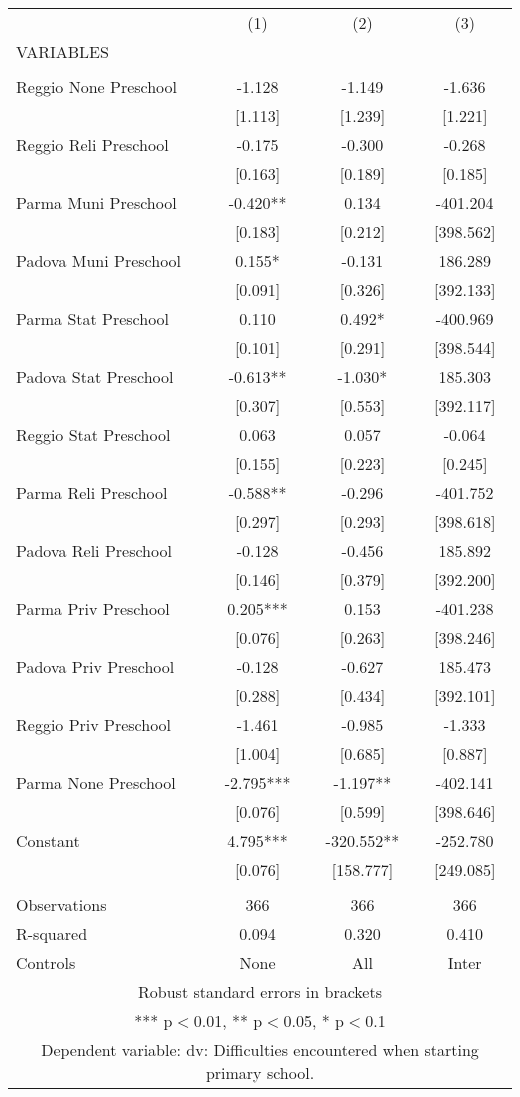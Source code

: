 \begin{tabular}{lccc} \hline
 & (1) & (2) & (3) \\
VARIABLES &  &  &  \\ \hline
 &  &  &  \\
Reggio None Preschool & -1.128 & -1.149 & -1.636 \\
 & [1.113] & [1.239] & [1.221] \\
Reggio Reli Preschool & -0.175 & -0.300 & -0.268 \\
 & [0.163] & [0.189] & [0.185] \\
Parma Muni Preschool & -0.420** & 0.134 & -401.204 \\
 & [0.183] & [0.212] & [398.562] \\
Padova Muni Preschool & 0.155* & -0.131 & 186.289 \\
 & [0.091] & [0.326] & [392.133] \\
Parma Stat Preschool & 0.110 & 0.492* & -400.969 \\
 & [0.101] & [0.291] & [398.544] \\
Padova Stat Preschool & -0.613** & -1.030* & 185.303 \\
 & [0.307] & [0.553] & [392.117] \\
Reggio Stat Preschool & 0.063 & 0.057 & -0.064 \\
 & [0.155] & [0.223] & [0.245] \\
Parma Reli Preschool & -0.588** & -0.296 & -401.752 \\
 & [0.297] & [0.293] & [398.618] \\
Padova Reli Preschool & -0.128 & -0.456 & 185.892 \\
 & [0.146] & [0.379] & [392.200] \\
Parma Priv Preschool & 0.205*** & 0.153 & -401.238 \\
 & [0.076] & [0.263] & [398.246] \\
Padova Priv Preschool & -0.128 & -0.627 & 185.473 \\
 & [0.288] & [0.434] & [392.101] \\
Reggio Priv Preschool & -1.461 & -0.985 & -1.333 \\
 & [1.004] & [0.685] & [0.887] \\
Parma None Preschool & -2.795*** & -1.197** & -402.141 \\
 & [0.076] & [0.599] & [398.646] \\
Constant & 4.795*** & -320.552** & -252.780 \\
 & [0.076] & [158.777] & [249.085] \\
 &  &  &  \\
Observations & 366 & 366 & 366 \\
R-squared & 0.094 & 0.320 & 0.410 \\
 Controls & None & All & Inter \\ \hline
\multicolumn{4}{c}{ Robust standard errors in brackets} \\
\multicolumn{4}{c}{ *** p$<$0.01, ** p$<$0.05, * p$<$0.1} \\
\multicolumn{4}{c}{ Dependent variable: dv: Difficulties encountered when starting primary school.} \\
\end{tabular}
